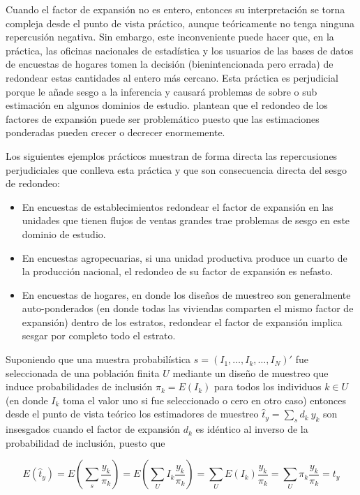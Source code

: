 \documentclass[
  12pt,
  spanish,
]{book}
\begin{document}
Cuando el factor de expansión no es entero, entonces su interpretación se torna compleja desde el punto de vista práctico, aunque teóricamente no tenga ninguna repercusión negativa. Sin embargo, este inconveniente puede hacer que, en la práctica, las oficinas nacionales de estadística y los usuarios de las bases de datos de encuestas de hogares tomen la decisión (bienintencionada pero errada) de redondear estas cantidades al entero más cercano. Esta práctica es perjudicial porque le añade sesgo a la inferencia y causará problemas de sobre o sub estimación en algunos dominios de estudio. \citet{Sartore_Toppin_Young_Spiegelman_2019} plantean que el redondeo de los factores de expansión puede ser problemático puesto que las estimaciones ponderadas pueden crecer o decrecer enormemente.

Los siguientes ejemplos prácticos muestran de forma directa las repercusiones perjudiciales que conlleva esta práctica y que son consecuencia directa del sesgo de redondeo:

\begin{itemize}
\item
  En encuestas de establecimientos redondear el factor de expansión en las unidades que tienen flujos de ventas grandes trae problemas de sesgo en este dominio de estudio.
\item
  En encuestas agropecuarias, si una unidad productiva produce un cuarto de la producción nacional, el redondeo de su factor de expansión es nefasto.
\item
  En encuestas de hogares, en donde los diseños de muestreo son generalmente auto-ponderados (en donde todas las viviendas comparten el mismo factor de expansión) dentro de los estratos, redondear el factor de expansión implica sesgar por completo todo el estrato.
\end{itemize}

Suponiendo que una muestra probabilística \(s=(I_1,\ldots,I_k,\ldots,I_N)'\) fue seleccionada de una población finita \(U\) mediante un diseño de muestreo que induce probabilidades de inclusión \(\pi_k= E(I_k)\) para todos los individuos \(k \in U\) (en donde \(I_k\) toma el valor uno si fue seleccionado o cero en otro caso) entonces desde el punto de vista teórico los estimadores de muestreo \(\hat t_y = \sum_s d_k \ y_k\) son insesgados cuando el factor de expansión \(d_k\) es idéntico al inverso de la probabilidad de inclusión, puesto que

\[
E(\hat t_y)
= E \left( \sum_s \frac{y_k}{\pi_k} \right)
= E \left(\sum_U I_k \frac{y_k}{\pi_k} \right)
= \sum_U E(I_k)  \frac{y_k}{\pi_k}
= \sum_U \pi_k \frac{y_k}{\pi_k} = t_y
\]
\end{document}
